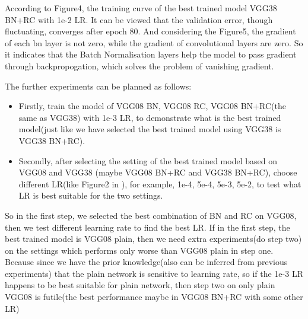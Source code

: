 {{    According to Figure4, the training curve of the best trained model VGG38 BN+RC with 1e-2 LR. 
    It can be viewed that the validation error, though fluctuating, converges after epoch 80.
    And considering the Figure5, the gradient of each bn layer is not zero, while the 
    gradient of convolutional layers are zero. So it indicates that the Batch Normalisation 
    layers help the model to pass gradient through backpropogation, which solves the 
    problem of vanishing gradient.

    The further experiments can be planned as follows:
    \begin{itemize}
        \item Firstly, train the model of VGG08 BN, VGG08 RC, VGG08 BN+RC(the same 
        as VGG38) with 1e-3 LR, to demonstrate what is the best trained model(just like we have 
        selected the best trained model using VGG38 is VGG38 BN+RC).
        \item Secondly, after selecting the setting of 
        the best trained model based on VGG08 and VGG38
        (maybe VGG08 BN+RC and VGG38 BN+RC), choose different 
        LR(like Figure2 in \cite{ioffe2015batch}), for example, 1e-4, 5e-4, 5e-3, 5e-2, to test 
        what LR is best suitable for the two settings. 
    \end{itemize}
        So in the first step, we selected the best combination of BN and RC on VGG08, then 
        we test different learning rate to find the best LR. If in the first step, the best 
        trained model is VGG08 plain, then we need extra experiments(do step two) on the 
        settings which performs only worse than VGG08 plain in step one. Because since we have 
        the prior knowledge(also can be inferred from previous experiments) that the plain 
        network is sensitive to learning rate, so if the 1e-3 LR happens to be best suitable for 
        plain network, then step two on only plain VGG08 is futile(the best performance maybe 
        in VGG08 BN+RC with some other LR)

}}

